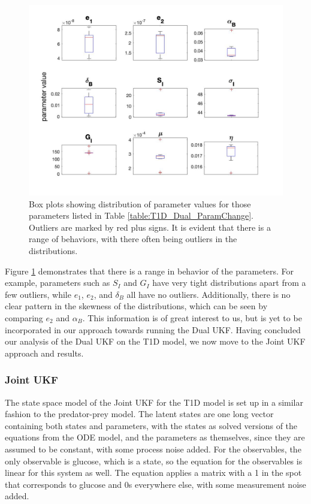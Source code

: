 \begin{figure}[H]
    \centering
    \includegraphics[width=15cm]{Kalman_Filter_Images/Dual_Parameter_BoxPlots.jpg}
    \caption{Box plots showing distribution of parameter values for those parameters listed in Table \ref{table:T1D_Dual_ParamChange}. Outliers are marked by red plus signs. It is evident that there is a range of behaviors, with there often being outliers in the distributions.}
    \label{fig:T1D_Dual_Parameter_BoxPlots}
\end{figure}

Figure \ref{fig:T1D_Dual_Parameter_BoxPlots} demonstrates that there is a range in behavior of the parameters. For example, parameters such as $S_I$ and $G_I$ have very tight distributions apart from a few outliers, while $e_1$, $e_2$, and $\delta_B$ all have no outliers. Additionally, there is no clear pattern in the skewness of the distributions, which can be seen by comparing $e_2$ and $\alpha_B$. This information is of great interest to us, but is yet to be incorporated in our approach towards running the Dual UKF. Having concluded our analysis of the Dual UKF on the T1D model, we now move to the Joint UKF approach and results.


\subsubsection{Joint UKF}

The state space model of the Joint UKF for the T1D model is set up in a similar fashion to the predator-prey model. The latent states are one long vector containing both states and parameters, with the states as solved versions of the equations from the ODE model, and the parameters as themselves, since they are assumed to be constant, with some process noise added. For the observables, the only observable is glucose, which is a state, so the equation for the observables is linear for this system as well. The equation applies a matrix with a 1 in the spot that corresponds to glucose and 0s everywhere else, with some measurement noise added. 

